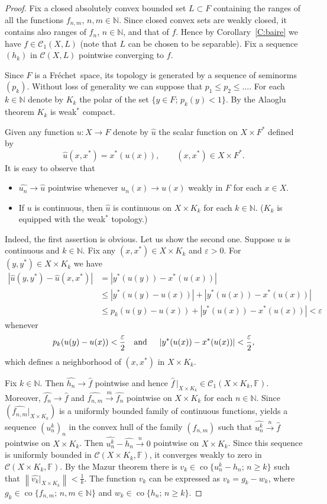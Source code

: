 \documentclass{amsart}
\numberwithin{equation}{section}
\theoremstyle{definition}
\def\C{\mathcal C}
\def\co{\operatorname{co}}
\def\en{\mathbb N}
\def\ef{\mathbb F}
\def\r{|}
\newcommand{\norm}[1]{\left\|#1\right\|}
\newcommand{\abs}[1]{\left| #1  \right|}
\newcommand{\setsep}{;\,}
\newcommand{\fr}{Fr\'echet\ }
\begin{document}
\begin{proof} Fix a closed absolutely convex bounded set $L\subset F$ containing the ranges of all the functions $f_{n,m}$, $n,m\in\en$. Since closed convex sets are weakly closed, it contains also ranges of $f_n$, $n\in\en$, and that of $f$.
Hence by Corollary~\ref{C:baire} we have $f\in\C_1(X,L)$ (note that $L$ can be chosen to be separable). Fix a sequence $(h_k)$ in $\C(X,L)$ pointwise converging to $f$.

Since $F$ is a \fr space, its topology is generated by a sequence of seminorms $(p_k)$. Without loss of generality we can
suppose that $p_1\le p_2\le \dots$. For each $k\in\en$ denote by $K_k$ the polar of the set $\{y\in F\setsep p_k(y)<1\}$. By the Alaoglu theorem $K_k$ is weak$^*$ compact. 

Given any function $u\colon X\to F$ denote by $\widehat{u}$ the scalar function on $X\times F^*$ defined by
$$ \widehat{u}(x,x^*)=x^*(u(x)), \qquad (x,x^*)\in X\times F^*.$$
It is easy to observe that
\begin{itemize}
	\item $\widehat{u_n}\to \widehat{u}$ pointwise whenever $u_n(x)\to u(x)$ weakly in $F$ for each $x\in X$.
	\item If $u$ is continuous, then $\widehat{u}$ is continuous on $X\times K_k$ for each $k\in\en$. ($K_k$ is equipped with the weak$^*$ topology.)
\end{itemize}
Indeed, the first assertion is obvious. Let us show the second one. Suppose $u$ is continuous and $k\in\en$.
Fix any $(x,x^*)\in X\times K_k$ and $\varepsilon>0$. For $(y,y^*)\in X\times K_k$ we have
$$\begin{aligned}\abs{\widehat{u}(y,y^*)-\widehat{u}(x,x^*)}&=\abs{y^*(u(y))-x^*(u(x))}
\\& \le \abs{y^*(u(y)-u(x))}+\abs{y^*(u(x))-x^*(u(x))}
\\& \le p_k(u(y)-u(x))+\abs{y^*(u(x))-x^*(u(x))}<\varepsilon\end{aligned}$$
whenever
$$p_k(u(y)-u(x))<\frac\varepsilon2\mbox{\quad and \quad}\abs{y^*(u(x))-x^*(u(x))}<\frac\varepsilon2,$$
which defines a neighborhood of $(x,x^*)$ in $X\times K_k$.

Fix $k\in \en$. Then $\widehat{h_n}\to \widehat{f}$ pointwise and hence $\widehat{f}\,\r_{X\times K_k}\in\C_1(X\times K_k,\ef)$. Moreover, $\widehat{f_n}\to \widehat{f}$ and $\widehat{f_{n,m}}\overset{m}{\longrightarrow} \widehat{f_n}$  pointwise on $X\times K_k$ for each $n\in\en$. Since  $(\widehat{f_{n,m}}\r_{X\times K_k})$ is a uniformly bounded family of continuous functions, \cite[Lemma 2.5]{MeSta} yields a sequence $(u^k_n)_n$ in the convex hull of the family $(f_{n,m})$ such that
$\widehat{u^k_n}\overset{n}{\longrightarrow}\widehat{f}$ pointwise on $X\times K_k$. Then $\widehat{u^k_n}-\widehat{h_n}\overset{n}{\longrightarrow}0$ pointwise on $X\times K_k$. Since this sequence is uniformly bounded in $\C(X\times K_k,\ef)$, it converges weakly to zero in $\C(X\times K_k,\ef)$. By the Mazur theorem there is
$v_k\in\co\{u^k_n-h_n\setsep n\ge k\}$ such that $\norm{\widehat{v_k}\r_{X\times K_k}}<\frac1k$. The function $v_k$ can be expressed as $v_k=g_k-w_k$, where $g_k\in\co\{f_{n,m}\setsep n,m\in\en\}$ and $w_k\in\co\{h_n\setsep n\ge k\}$.


\end{proof}
\end{document}

